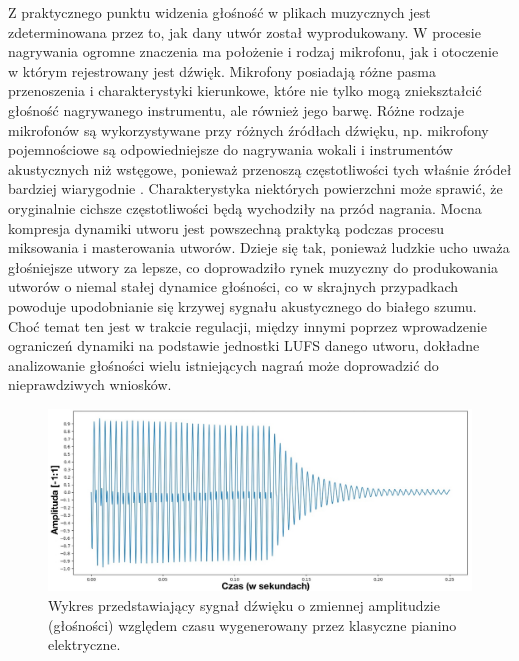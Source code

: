 \documentclass[12pt,a4paper,twoside]{mwart}
\begin{document}
Z praktycznego punktu widzenia głośność w plikach muzycznych jest zdeterminowana przez to, jak dany utwór został wyprodukowany. W procesie nagrywania ogromne znaczenia ma położenie i rodzaj mikrofonu, jak i otoczenie w którym rejestrowany jest dźwięk. Mikrofony posiadają różne pasma przenoszenia i charakterystyki kierunkowe, które nie tylko mogą zniekształcić głośność nagrywanego instrumentu, ale również jego barwę. Różne rodzaje mikrofonów są wykorzystywane przy różnych źródłach dźwięku, np. mikrofony pojemnościowe są odpowiedniejsze do nagrywania wokali i instrumentów akustycznych niż wstęgowe, ponieważ przenoszą częstotliwości tych właśnie źródeł bardziej wiarygodnie 
\cite[48-52]{Homerecording:DlaKazdego}.
Charakterystyka niektórych powierzchni może sprawić, że oryginalnie cichsze częstotliwości będą wychodziły na przód nagrania. Mocna kompresja dynamiki utworu jest powszechną praktyką podczas procesu miksowania i masterowania utworów. Dzieje się tak, ponieważ ludzkie ucho uważa głośniejsze utwory za lepsze, co doprowadziło rynek muzyczny do produkowania utworów o niemal stałej dynamice głośności, co w skrajnych przypadkach powoduje upodobnianie się krzywej sygnału akustycznego do białego szumu. Choć temat ten jest w trakcie regulacji, między innymi poprzez wprowadzenie ograniczeń dynamiki na podstawie jednostki LUFS danego utworu, dokładne analizowanie głośności wielu istniejących nagrań może doprowadzić do nieprawdziwych wniosków.

\begin{figure}[H]
  \begin{center}
    \includegraphics[scale=0.32]{images/Amplitude.jpg}
    \caption{Wykres przedstawiający sygnał dźwięku o zmiennej amplitudzie (głośności) względem czasu wygenerowany przez klasyczne pianino elektryczne.}
    \label{fig:amplitude}
  \end{center}
\end{figure}
\end{document}
